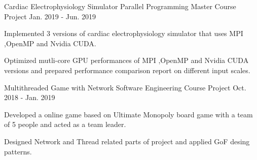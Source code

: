 
\begin{cventries}
  \cventry
   {Cardiac Electrophysiology Simulator} %
    {Parallel Programming Master Course Project} %
    {} %
    {Jan. 2019 - Jun. 2019} %
    {
      \begin{cvitems} %
      	\item {Implemented 3 versions of cardiac electrophysiology simulator that uses MPI ,OpenMP and Nvidia CUDA.}
      	\item {Optimized mutli-core GPU performances of MPI ,OpenMP and Nvidia CUDA versions and prepared performance comparison report on different input scales.}
      \end{cvitems}
    }
  \cventry
   {Multithreaded Game with Network} %
    {Software Engineering Course Project} %
    {} %
    {Oct. 2018 - Jan. 2019} %
    {
      \begin{cvitems} %
      	\item {Developed a online game based on Ultimate Monopoly board game with a team of 5 people and acted as a team leader.} 
      	\item {Designed Network and Thread related parts of project and applied GoF desing patterns.} 
      \end{cvitems}
    }

\end{cventries}
